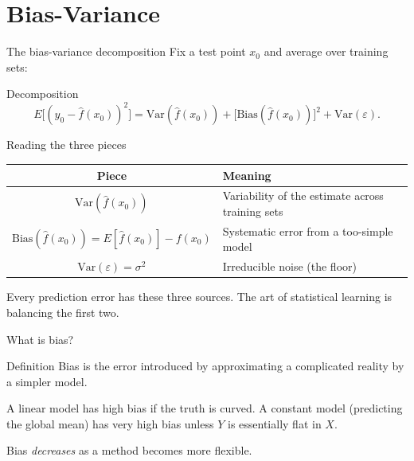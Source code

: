 \documentclass[aspectratio=169,11pt]{beamer}
\begin{document}
\section{Bias-Variance}

\begin{frame}{The bias-variance decomposition}
  Fix a test point $x_0$ and average over training sets:
  \begin{block}{Decomposition}
    \[
      \boxed{\;
        E\bigl[(y_0 - \hat f(x_0))^2\bigr]
          = \mathrm{Var}(\hat f(x_0))
          + \bigl[\mathrm{Bias}(\hat f(x_0))\bigr]^2
          + \mathrm{Var}(\varepsilon).
      \;}
    \]
  \end{block}
\end{frame}

\begin{frame}{Reading the three pieces}
  \begin{readme}
    \begin{tabular}{@{}cl@{}}
      \toprule
      \textbf{Piece} & \textbf{Meaning} \\
      \midrule
      $\mathrm{Var}(\hat f(x_0))$ &
        Variability of the estimate across training sets \\
      $\mathrm{Bias}(\hat f(x_0)) = E[\hat f(x_0)] - f(x_0)$ &
        Systematic error from a too-simple model \\
      $\mathrm{Var}(\varepsilon) = \sigma^2$ &
        Irreducible noise (the floor) \\
      \bottomrule
    \end{tabular}
  \end{readme}
  \begin{takeaway}
    Every prediction error has these three sources. The art of
    statistical learning is balancing the first two.
  \end{takeaway}
\end{frame}

\begin{frame}{What is bias?}
  \begin{block}{Definition}
    Bias is the error introduced by approximating a complicated
    reality by a simpler model.
  \end{block}
  \begin{numexample}
    A linear model has high bias if the truth is curved. A constant
    model (predicting the global mean) has very high bias unless $Y$
    is essentially flat in $X$.
  \end{numexample}
  \begin{takeaway}
    Bias \emph{decreases} as a method becomes more flexible.
  \end{takeaway}
\end{frame}
\end{document}
